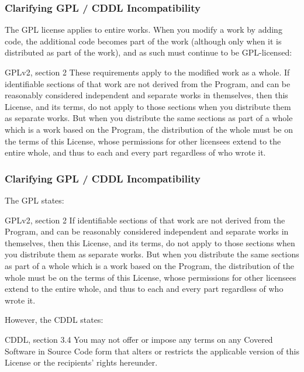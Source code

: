 \begin{frame}
\frametitle{Clarifying GPL / CDDL Incompatibility}

The GPL license applies to entire works. When you modify a work by adding code, the additional code becomes part of the work (although only when it is distributed as part of the work), and as such must continue to be GPL-licensed: 

\begin{block}{GPLv2, section 2}
\footnotesize
These requirements apply to the modified work as a whole. If identifiable sections of that work are not derived from the Program, and can be reasonably considered independent and separate works in themselves, then this License, and its terms, do not apply to those sections when you distribute them as separate works. But when you distribute the same sections as part of a whole which is a work based on the Program, the distribution of the whole must be on the terms of this License, whose permissions for other licensees extend to the entire whole, and thus to each and every part regardless of who wrote it. \end{block}

\end{frame}




\begin{frame}
\frametitle{Clarifying GPL / CDDL Incompatibility}

The GPL states:
\begin{block}{GPLv2, section 2}
\footnotesize
If identifiable sections of that work are not derived from the Program, and can be reasonably considered independent and separate works in themselves, then this License, and its terms, do not apply to those sections when you distribute them as separate works. But when you distribute the same sections as part of a whole which is a work based on the Program, the distribution of the whole must be on the terms of this License, whose permissions for other licensees extend to the entire whole, and thus to each and every part regardless of who wrote it.
\end{block}

However, the CDDL states:
\begin{block}{CDDL, section 3.4}
\footnotesize
You may not offer or impose any terms on any Covered Software in Source Code form that alters or restricts the applicable version of this License or the recipients' rights hereunder.
\end{block}

\end{frame}


